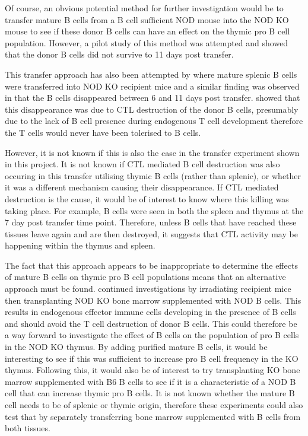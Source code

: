 Of course, an obvious potential method for further investigation would be to transfer mature B cells from a B cell sufficient NOD mouse into the NOD KO mouse to see if these donor B cells can have an effect on the thymic pro B cell population.
However, a pilot study of this method was attempted and showed that the donor B cells did not survive to 11 days post transfer.

This transfer approach has also been attempted by \citet{Serreze1998} where mature splenic B cells were transferred into NOD KO recipient mice and a similar finding was observed in that the B cells disappeared between 6 and 11 days post transfer.
\citet{Serreze1998} showed that this disappearance was due to CTL destruction of the donor B cells, presumably due to the lack of B cell presence during endogenous T cell development therefore the T cells would never have been tolerised to B cells.

However, it is not known if this is also the case in the transfer experiment shown in this project.
It is not known if CTL mediated B cell destruction was also occuring in this transfer utilising thymic B cells (rather than splenic), or whether it was a different mechanism causing their disappearance. 
If CTL mediated destruction is the cause, it would be of interest to know where this killing was taking place. 
For example, B cells were seen in both the spleen and thymus at the 7 day post transfer time point.
Therefore, unless B cells that have reached these tissues leave again and are then destroyed, it suggests that CTL activity may be happening within the thymus and spleen. 

The fact that this approach appears to be inappropriate to determine the effects of mature B cells on thymic pro B cell populations means that an alternative approach must be found.
\citet{Serreze1998} continued investigations by irradiating recipient mice then transplanting NOD KO bone marrow supplemented with NOD B cells.
This results in endogenous effector immune cells developing in the presence of B cells and should avoid the T cell destruction of donor B cells.
This could therefore be a way forward to investigate the effect of B cells on the population of pro B cells in the NOD KO thymus.
By adding purified mature B cells, it would be interesting to see if this was sufficient to increase pro B cell frequency in the KO thymus.
Following this, it would also be of interest to try transplanting KO bone marrow supplemented with B6 B cells to see if it is a characteristic of a NOD B cell that can increase thymic pro B cells.
It is not known whether the mature B cell needs to be of splenic or thymic origin, therefore these experiments could also test that by separately transferring bone marrow supplemented with B cells from both tissues.

